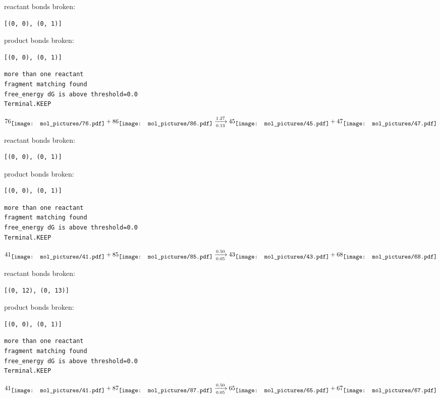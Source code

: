 \documentclass{article}
\begin{document}
reactant bonds broken:\begin{verbatim}
[(0, 0), (0, 1)]
\end{verbatim}
product bonds broken:\begin{verbatim}
[(0, 0), (0, 1)]
\end{verbatim}




\vspace{1cm}
\begin{verbatim}
more than one reactant
fragment matching found
free_energy dG is above threshold=0.0
Terminal.KEEP
\end{verbatim}
$$
76
\raisebox{-.5\height}{\texttt{[image: mol\_pictures/76.pdf]}}
+
86
\raisebox{-.5\height}{\texttt{[image: mol\_pictures/86.pdf]}}
\xrightarrow[0.13]{1.27}
45
\raisebox{-.5\height}{\texttt{[image: mol\_pictures/45.pdf]}}
+
47
\raisebox{-.5\height}{\texttt{[image: mol\_pictures/47.pdf]}}
$$


reactant bonds broken:\begin{verbatim}
[(0, 0), (0, 1)]
\end{verbatim}
product bonds broken:\begin{verbatim}
[(0, 0), (0, 1)]
\end{verbatim}




\vspace{1cm}
\begin{verbatim}
more than one reactant
fragment matching found
free_energy dG is above threshold=0.0
Terminal.KEEP
\end{verbatim}
$$
41
\raisebox{-.5\height}{\texttt{[image: mol\_pictures/41.pdf]}}
+
85
\raisebox{-.5\height}{\texttt{[image: mol\_pictures/85.pdf]}}
\xrightarrow[0.05]{0.50}
43
\raisebox{-.5\height}{\texttt{[image: mol\_pictures/43.pdf]}}
+
68
\raisebox{-.5\height}{\texttt{[image: mol\_pictures/68.pdf]}}
$$


reactant bonds broken:\begin{verbatim}
[(0, 12), (0, 13)]
\end{verbatim}
product bonds broken:\begin{verbatim}
[(0, 0), (0, 1)]
\end{verbatim}




\vspace{1cm}
\begin{verbatim}
more than one reactant
fragment matching found
free_energy dG is above threshold=0.0
Terminal.KEEP
\end{verbatim}
$$
41
\raisebox{-.5\height}{\texttt{[image: mol\_pictures/41.pdf]}}
+
87
\raisebox{-.5\height}{\texttt{[image: mol\_pictures/87.pdf]}}
\xrightarrow[0.05]{0.50}
65
\raisebox{-.5\height}{\texttt{[image: mol\_pictures/65.pdf]}}
+
67
\raisebox{-.5\height}{\texttt{[image: mol\_pictures/67.pdf]}}
$$
\end{document}
